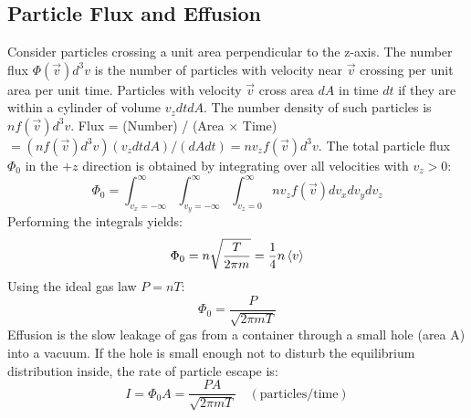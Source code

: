 \documentclass[10pt, letterpaper]{article}
\newcommand{\avg}[1]{\expval{#1}} %
\begin{document}
\subsection{Particle Flux and Effusion}
Consider particles crossing a unit area perpendicular to the z-axis. The number flux $\Phi(\vec{v}) d^3v$ is the number of particles with velocity near $\vec{v}$ crossing per unit area per unit time.
Particles with velocity $\vec{v}$ cross area $dA$ in time $dt$ if they are within a cylinder of volume $v_z dt dA$. The number density of such particles is $n f(\vec{v}) d^3v$.
Flux = (Number) / (Area $\times$ Time) $= (n f(\vec{v}) d^3v) (v_z dt dA) / (dA dt) = n v_z f(\vec{v}) d^3v$.
The total particle flux $\Phi_0$ in the $+z$ direction is obtained by integrating over all velocities with $v_z > 0$:
\begin{equation*}
    \Phi_0 = \int_{v_x=-\infty}^{\infty} \int_{v_y=-\infty}^{\infty} \int_{v_z=0}^{\infty} n v_z f(\vec{v}) dv_x dv_y dv_z
\end{equation*}
Performing the integrals yields:
\begin{equation}
    \Phi_0 = n \sqrt{\frac{T}{2\pi m}} = \frac{1}{4} n \avg{v}
\end{equation}
Using the ideal gas law $P=nT$:
\begin{equation}
    \Phi_0 = \frac{P}{\sqrt{2 \pi m T}}
\end{equation}
Effusion is the slow leakage of gas from a container through a small hole (area A) into a vacuum. If the hole is small enough not to disturb the equilibrium distribution inside, the rate of particle escape is:
\begin{equation}
    I = \Phi_0 A = \frac{P A}{\sqrt{2 \pi m T}} \quad (\text{particles/time})
\end{equation}
\end{document}
